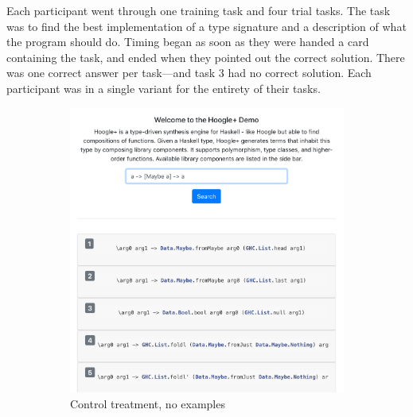 Each participant went through one training task and four trial tasks.
%
The task was to find the best implementation of a type signature and a
description of what the program should do.
%
Timing began as soon as they were handed a card containing the task, and ended
when they pointed out the correct solution.
%
There was one correct answer per task---and task 3 had no correct solution.
%
Each participant was in a single variant for the entirety of their tasks.

\begin{figure}[t!]
    \centering
    \begin{subfigure}[t]{0.5\textwidth}
        \centering
        \includegraphics[width=\textwidth]{method/control-ui.png}
        \caption{Control treatment, no examples}
    \end{subfigure}%
    ~
    \begin{subfigure}[t]{0.5\textwidth}
        \centering

\end{subfigure}
\end{figure}
